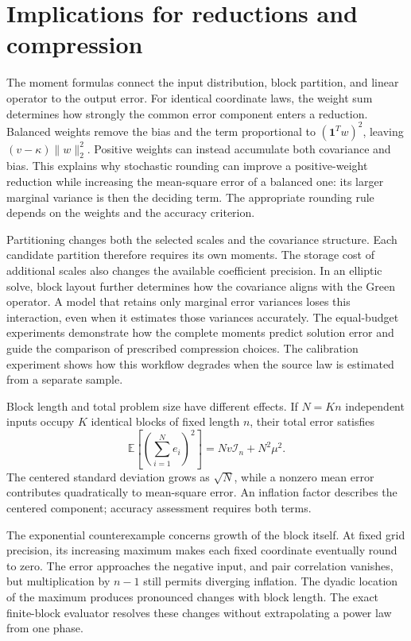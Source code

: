 \section{Implications for reductions and compression}\label{sec:discussion}
The moment formulas connect the input distribution, block partition, and
linear operator to the output error. For identical coordinate laws, the
weight sum determines how strongly the common error component enters a
reduction. Balanced weights remove the bias and the term proportional to
$(\mathbf1^Tw)^2$, leaving $(v-\kappa)\|w\|_2^2$. Positive weights can
instead accumulate both covariance and bias. This explains why stochastic
rounding can improve a positive-weight reduction while increasing the
mean-square error of a balanced one: its larger marginal variance is then
the deciding term. The appropriate rounding rule depends on the weights
and the accuracy criterion.

Partitioning changes both the selected scales and the covariance structure.
Each candidate partition therefore requires its own moments. The storage
cost of additional scales also changes the available coefficient precision.
In an elliptic solve, block layout further determines how the covariance
aligns with the Green operator. A model that retains only marginal error
variances loses this interaction, even when it estimates those variances
accurately. The equal-budget experiments demonstrate how the complete
moments predict solution error and guide the comparison of prescribed
compression choices. The calibration experiment shows how this workflow
degrades when the source law is estimated from a separate sample.

Block length and total problem size have different effects. If $N=Kn$
independent inputs occupy $K$ identical blocks of fixed length $n$, their
total error satisfies
\begin{equation}\label{eq:multiblock-mse}
 \mathbb E\left[\left(\sum_{i=1}^{N}e_i\right)^2\right]
 =Nv\mathcal I_n+N^2\mu^2.
\end{equation}
The centered standard deviation grows as $\sqrt N$, while a nonzero mean
error contributes quadratically to mean-square error. An inflation factor
describes the centered component; accuracy assessment requires both terms.

The exponential counterexample concerns growth of the block itself. At
fixed grid precision, its increasing maximum makes each fixed coordinate
eventually round to zero. The error approaches the negative input, and
pair correlation vanishes, but multiplication by $n-1$ still permits
diverging inflation. The dyadic location of the maximum produces pronounced
changes with block length. The exact finite-block evaluator resolves these
changes without extrapolating a power law from one phase.

